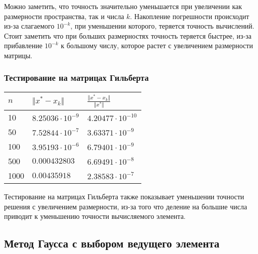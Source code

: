 \documentclass[english]{article}
\begin{document}
Можно заметить, что точность значительно уменьшается при увеличении
как размерности пространства, так и числа \(k\). Накопление
погрешности происходит из-за слагаемого \(10^{-k}\), при уменьшении
которого, теряется точность вычислений. Стоит заметить что при больших
размерностях точность теряется быстрее, из-за прибавление \(10^{-k}\)
к большому числу, которое растет с увеличением размерности матрицы.

\subsubsection{Тестирование на матрицах Гильберта}
\begin{center}
  \begin{longtable}{l|l|l}
    \(n\) & \(\Vert x^* - x_k \Vert\) & \(\frac{\Vert x^* - x_k \Vert}{\Vert x^* \Vert}\) \\
    \hline
    10 & \(8.25036\cdot 10^{-9}\) & \(4.20477\cdot 10^{-10}\) \\
    50 & \(7.52844\cdot 10^{-7}\) & \(3.63371\cdot 10^{-9}\) \\
    100 & \(3.95193\cdot 10^{-6}\) & \(6.79401\cdot 10^{-9}\) \\
    500 & \(0.000432803\) & \(6.69491\cdot 10^{-8}\) \\
    1000 & \(0.00435918 \) & \(2.38583\cdot 10^{-7}\) 
  \end{longtable}
\end{center}

Тестирование на матрицах Гильберта также показывает уменьшении
точности решения с увеличением размерности, из-за того что деление на
большие числа приводит к уменьшению точности вычисляемого элемента.

\subsection{Метод Гаусса с выбором ведущего элемента}
\end{document}
